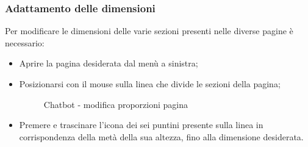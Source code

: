\documentclass[10pt, a4paper]{article}
\begin{document}
\subsubsection{Adattamento delle dimensioni}
Per modificare le dimensioni delle varie sezioni presenti nelle diverse pagine è necessario:
\begin{itemize}
    \item Aprire la pagina desiderata dal menù a sinistra;
    \item Posizionarsi con il mouse sulla linea che divide le sezioni della pagina;
    \begin{figure}[H]
        \centering  
        \caption{Chatbot - modifica proporzioni pagina}
    \end{figure}
    \item Premere e trascinare l'icona dei sei puntini presente sulla linea in corrispondenza della metà della sua altezza, fino alla dimensione desiderata.
\end{itemize}
\end{document}
